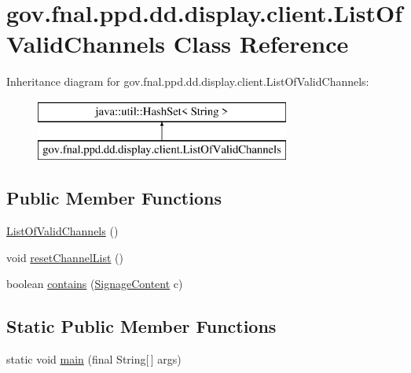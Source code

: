 \hypertarget{classgov_1_1fnal_1_1ppd_1_1dd_1_1display_1_1client_1_1ListOfValidChannels}{\section{gov.\-fnal.\-ppd.\-dd.\-display.\-client.\-List\-Of\-Valid\-Channels Class Reference}
\label{classgov_1_1fnal_1_1ppd_1_1dd_1_1display_1_1client_1_1ListOfValidChannels}
}
Inheritance diagram for gov.\-fnal.\-ppd.\-dd.\-display.\-client.\-List\-Of\-Valid\-Channels\-:\begin{figure}[H]
\begin{center}
\leavevmode
\includegraphics[height=2.000000cm]{classgov_1_1fnal_1_1ppd_1_1dd_1_1display_1_1client_1_1ListOfValidChannels}
\end{center}
\end{figure}
\subsection*{Public Member Functions}
\begin{DoxyCompactItemize}
\item 
\hyperlink{classgov_1_1fnal_1_1ppd_1_1dd_1_1display_1_1client_1_1ListOfValidChannels_a32b06c35045255ed512433f0a9c3d115}{List\-Of\-Valid\-Channels} ()
\item 
void \hyperlink{classgov_1_1fnal_1_1ppd_1_1dd_1_1display_1_1client_1_1ListOfValidChannels_ac7e8b27fed18f295c739273b25cc16f3}{reset\-Channel\-List} ()
\item 
boolean \hyperlink{classgov_1_1fnal_1_1ppd_1_1dd_1_1display_1_1client_1_1ListOfValidChannels_a46ab473927c0c932b8465dd400e5058b}{contains} (\hyperlink{interfacegov_1_1fnal_1_1ppd_1_1dd_1_1signage_1_1SignageContent}{Signage\-Content} c)
\end{DoxyCompactItemize}
\subsection*{Static Public Member Functions}
\begin{DoxyCompactItemize}
\item 
static void \hyperlink{classgov_1_1fnal_1_1ppd_1_1dd_1_1display_1_1client_1_1ListOfValidChannels_a34961cda5b105caf8a82592ae0673b8a}{main} (final String\mbox{[}$\,$\mbox{]} args)
\end{DoxyCompactItemize}


